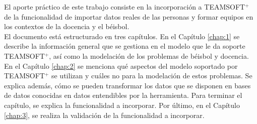 El aporte práctico de este trabajo consiste en la incorporación a TEAMSOFT$^+$ de la funcionalidad de importar datos reales de las personas y formar equipos en los contextos de la docencia y el béisbol. \\

El documento está estructurado en tres capítulos. En el Capítulo \ref{chap:1} se describe la información general que se gestiona en el modelo que le da soporte TEAMSOFT$^+$, así como la modelación de los problemas de béisbol y docencia. En el Capítulo \ref{chap:2} se menciona qué aspectos del modelo soportado por TEAMSOFT$^+$ se utilizan y cuáles no para la modelación de estos problemas. Se explica además, cómo se pueden transformar los datos que se disponen en bases de datos conocidas \citep{DISERTIC2020, INDER2020} en datos entendibles por la herramienta. Para terminar el capítulo, se explica la funcionalidad a incorporar. Por último, en el Capítulo \ref{chap:3},  se realiza la validación de la funcionalidad a incorporar.

